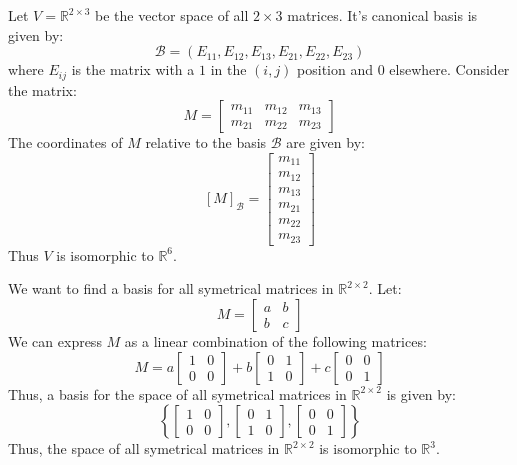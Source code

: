 \begin{eg}
    Let $V = \mathbb{R}^{2 \times 3}$ be the vector space of all $2 \times 3$ matrices. It's canonical basis is given by:
    \[ \mathcal{B} = \left( E_{11}, E_{12}, E_{13}, E_{21}, E_{22}, E_{23} \right) \]
    where $E_{ij}$ is the matrix with a $1$ in the $(i,j)$ position and $0$ elsewhere. Consider the matrix:
    \[ M = \begin{bmatrix}
        m_{11} & m_{12} & m_{13} \\
        m_{21} & m_{22} & m_{23}
    \end{bmatrix} \]
    The coordinates of $M$ relative to the basis $\mathcal{B}$ are given by:
    \[ [M]_{\mathcal{B}} = \begin{bmatrix}
        m_{11} \\ m_{12} \\ m_{13} \\ m_{21} \\ m_{22} \\ m_{23}
    \end{bmatrix} \]
    Thus $V$ is isomorphic to $\mathbb{R}^6$.
\end{eg}

\begin{eg}
    We want to find a basis for all symetrical matrices in $\mathbb{R}^{2 \times 2}$. Let:
    \[ M = \begin{bmatrix}
        a & b \\
        b & c
    \end{bmatrix} \]
    We can express $M$ as a linear combination of the following matrices:
    \[ M = a \begin{bmatrix}
        1 & 0 \\
        0 & 0
    \end{bmatrix} + b \begin{bmatrix}
        0 & 1 \\
        1 & 0
    \end{bmatrix} + c \begin{bmatrix}
        0 & 0 \\
        0 & 1
    \end{bmatrix} \]
    Thus, a basis for the space of all symetrical matrices in $\mathbb{R}^{2 \times 2}$ is given by:
    \[ \left\{ \begin{bmatrix}
        1 & 0 \\
        0 & 0
    \end{bmatrix}, \begin{bmatrix}
        0 & 1 \\
        1 & 0
    \end{bmatrix}, \begin{bmatrix}
        0 & 0 \\
        0 & 1
    \end{bmatrix} \right\} \]
    Thus, the space of all symetrical matrices in $\mathbb{R}^{2 \times 2}$ is isomorphic to $\mathbb{R}^3$.
\end{eg}

